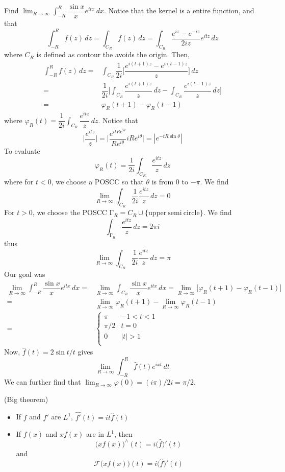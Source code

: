\begin{ex}
Find $\lim _{R\rightarrow \infty }\int _{-R}^{R}\dfrac{\sin x}{x}e^{itx}\,dx$. Notice that the kernel is a entire function, and that
\[\int ^{R}_{-R}f(z)\,dz=\int _{C_{R}}f(z)\,dz=\int _{C_{R}}\dfrac{e^{iz}-e^{-iz}}{2iz}e^{itz}\,dz\]
where $C_{R}$ is defined as contour the avoids the origin. Then,
\[\begin{align*}
\int ^{R}_{-R}f(z)\,dz=&\int _{C_{R}}\dfrac{1}{2i}\Big[\dfrac{e^{i(t+1)z}-e^{i(t-1)z}}{z}\Big]\,dz\\
=&\dfrac{1}{2i}\Big[\int _{C_{R}}\dfrac{e^{i(t+1)z}}{z}\,dz-\int _{C_{R}}\dfrac{e^{i(t-1)z}}{z}\,dz\Big]\\
=&\varphi _{R}(t+1)-\varphi _{R}(t-1)
\end{align*}\]
where $\varphi  _{R}(t)=\dfrac{1}{2i}\int _{C_{R}}\dfrac{e^{itz}}{z}\,dz$. Notice that
\[\Big|\dfrac{e^{itz}}{z}\Big|=\Big|\dfrac{e^{itRe^{i\theta }}}{Re^{i\theta }}iRe^{i\theta }\Big|=|e^{-tR\sin \theta }|\]
To evaluate 
\[\varphi _{R}(t)=\dfrac{1}{2i}\int_{C_{R}}\dfrac{e^{itz}}{z}\,dz\]
where for $t<0$, we choose a POSCC so that $\theta $ is from $0$ to $-\pi $. We find
\[\lim _{R\rightarrow \infty }\int _{C_{R}}\dfrac{1}{2i}\dfrac{e^{itz}}{z}\,dz=0\]
For $t>0$, we choose the POSCC $\mathrm{\Gamma} _{R}=C_{R}\cup \{\mathrm{upper\ semi\ circle}\}$. We find
\[\int _{\mathrm{\Gamma} _{R}}\dfrac{e^{itz}}{z}\,dz=2\pi i\]
thus 
\[\lim _{R\rightarrow \infty }\int _{C_{R}}\dfrac{1}{2i}\dfrac{e^{itz}}{z}\,dz=\pi \]
Our goal was
\[\begin{align*}
\lim _{R\rightarrow \infty }\int ^{R}_{-R}\dfrac{\sin x}{x}e^{itx}\,dx=&\lim _{R\rightarrow \infty }\int _{C_{R}}\dfrac{\sin x}{x}e^{itx}\,dx=\lim _{R\rightarrow \infty }\Big[\varphi  _{R}(t+1)-\varphi _{R}(t-1)\Big]\\
=&\lim _{R\rightarrow \infty }\varphi _{R}(t+1)-\lim _{R\rightarrow \infty }\varphi _{R}(t-1)\\
=&\begin{cases}
\pi &-1<t<1\\
\pi /2&t=0\\ 
0& |t|>1\\
\end{cases}
\end{align*}\]
Now, $\hat{f}(t)=2\sin t/t$ gives
\[\lim _{R\rightarrow \infty }\int _{-R}^{R}\hat{f}(t)e^{ixt}\,dt\]
We can further find that $\lim _{R\rightarrow \infty }\varphi (0)=(i\pi )/2i=\pi /2$. 
\end{ex}
\vspace{2ex}
\begin{thm}
(Big theorem) 
\begin{itemize}
\item[(i)] If $f$ and $f'$ are $L^{1}$, $\hat{f'}(t)=it\hat{f}(t)$ 
\item[(ii)] If $f(x)$ and $xf(x)$ are in $L^{1}$, then
\[\big(xf(x)\big)^{\wedge}(t)=i\big(\hat{f}\big)'(t)\]
and
\[\mathcal{F}\big(xf(x)\big)(t)=i\big(\hat{f}\big)'(t)\]
\end{itemize}
\end{thm}
